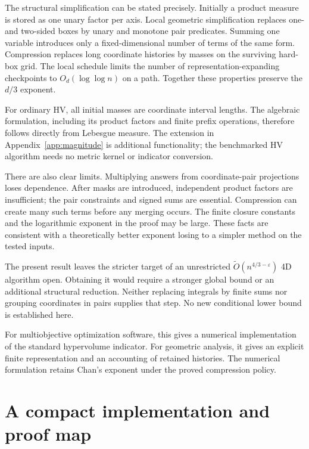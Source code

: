 \documentclass[12pt,a4paper]{article}
\theoremstyle{definition}
\newcommand{\wtO}{\widetilde O}
\begin{document}
The structural simplification can be stated precisely. Initially a
product measure is stored as one unary factor per axis. Local geometric
simplification replaces one- and two-sided boxes by unary and monotone
pair predicates. Summing one variable introduces only a fixed-dimensional
number of terms of the same form. Compression replaces long coordinate
histories by masses on the surviving hard-box grid. The local schedule
limits the number of representation-expanding checkpoints to
$O_d(\log\log n)$ on a path. Together these properties preserve the
$d/3$ exponent.

For ordinary HV, all initial masses are coordinate interval lengths.
The algebraic formulation, including its product factors and finite
prefix operations, therefore follows directly from Lebesgue measure.
The extension in Appendix~\ref{app:magnitude} is additional functionality;
the benchmarked HV algorithm needs no metric kernel or indicator conversion.

There are also clear limits. Multiplying answers from coordinate-pair
projections loses dependence. After masks are introduced, independent
product factors are insufficient; the pair constraints and signed sums
are essential. Compression can create many such terms before any merging
occurs. The finite closure constants and the logarithmic exponent in the
proof may be large. These facts are consistent with a theoretically better
exponent losing to a simpler method on the tested inputs.

The present result leaves the stricter target of an unrestricted
$\wtO(n^{4/3-\varepsilon})$ 4D algorithm open. Obtaining it would require
a stronger global bound or an additional structural reduction. Neither
replacing integrals by finite sums nor grouping coordinates in pairs
supplies that step. No new conditional lower bound is established here.

For multiobjective optimization software, this gives a numerical implementation of the standard
hypervolume indicator. For geometric analysis, it gives
an explicit finite representation and an accounting of retained histories.
The numerical formulation retains Chan's exponent under the proved
compression policy.

\clearpage
\appendix

\clearpage

\clearpage
\section{A compact implementation and proof map}
\label{app:map}
\end{document}
